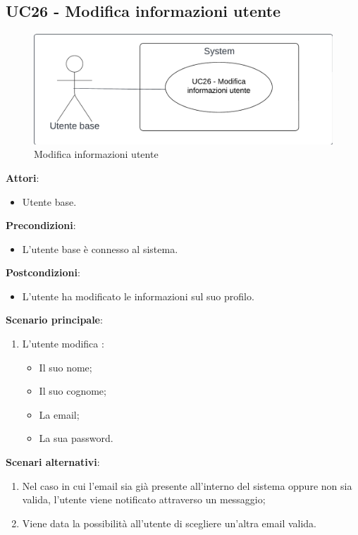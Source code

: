 \subsection{UC26 - Modifica informazioni utente}\label{usecase:26}
\begin{figure}[H]
\centering
\includegraphics[width=0.75\linewidth]{ucd/UCD26}
\caption{Modifica informazioni utente}
\end{figure}
\textbf{Attori}:
\begin{itemize}
    \item Utente base.
\end{itemize}
\textbf{Precondizioni}:
\begin{itemize}
    \item L'utente base è connesso al sistema.
\end{itemize}
\textbf{Postcondizioni}:
\begin{itemize}
    \item L'utente ha modificato le informazioni sul suo profilo.
\end{itemize}
\textbf{Scenario principale}:
\begin{enumerate}
    \item L'utente modifica :
    \begin{itemize}
        \item Il suo nome;
        \item Il suo cognome;
        \item La email;
        \item La sua password.
    \end{itemize}
\end{enumerate}
\textbf{Scenari alternativi}:
\begin{enumerate}
    \item Nel caso in cui l'email sia già presente all'interno del sistema oppure non sia valida, l'utente viene notificato attraverso un messaggio;
    \item Viene data la possibilità all'utente di scegliere un'altra email valida.
\end{enumerate}
\newpage
